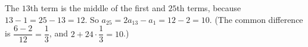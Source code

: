 The $13$th term is the middle of the first and $25$th terms, because $13-1=25-13=12$. So $a_{25}=2a_{13}-a_1=12-2=\boxed{10}$. (The common difference is $\dfrac{6-2}{12}=\dfrac{1}{3}$, and $2+24\cdot\dfrac{1}{3}=10$.)
